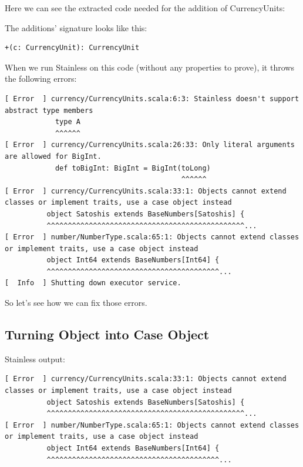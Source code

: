 \documentclass[runningheads]{llncs}
\begin{document}
Here we can see the extracted code needed for the addition of CurrencyUnits:



The additions' signature looks like this:
\begin{lstlisting}[style=scala]
  +(c: CurrencyUnit): CurrencyUnit
\end{lstlisting}

When we run Stainless on this code (without any properties to prove), it throws the following errors:

\begin{lstlisting}[style=stainless]
[ Error  ] currency/CurrencyUnits.scala:6:3: Stainless doesn't support abstract type members
            type A
            ^^^^^^
[ Error  ] currency/CurrencyUnits.scala:26:33: Only literal arguments are allowed for BigInt.
            def toBigInt: BigInt = BigInt(toLong)
                                          ^^^^^^
[ Error  ] currency/CurrencyUnits.scala:33:1: Objects cannot extend classes or implement traits, use a case object instead
          object Satoshis extends BaseNumbers[Satoshis] {
          ^^^^^^^^^^^^^^^^^^^^^^^^^^^^^^^^^^^^^^^^^^^^^^^...
[ Error  ] number/NumberType.scala:65:1: Objects cannot extend classes or implement traits, use a case object instead
          object Int64 extends BaseNumbers[Int64] {
          ^^^^^^^^^^^^^^^^^^^^^^^^^^^^^^^^^^^^^^^^^...
[  Info  ] Shutting down executor service.
\end{lstlisting}

So let's see how we can fix those errors.


\subsection{Turning Object into Case Object}

Stainless output:
\begin{lstlisting}[style=stainless]
[ Error  ] currency/CurrencyUnits.scala:33:1: Objects cannot extend classes or implement traits, use a case object instead
          object Satoshis extends BaseNumbers[Satoshis] {
          ^^^^^^^^^^^^^^^^^^^^^^^^^^^^^^^^^^^^^^^^^^^^^^^...
[ Error  ] number/NumberType.scala:65:1: Objects cannot extend classes or implement traits, use a case object instead
          object Int64 extends BaseNumbers[Int64] {
          ^^^^^^^^^^^^^^^^^^^^^^^^^^^^^^^^^^^^^^^^^...
\end{lstlisting}
\end{document}
